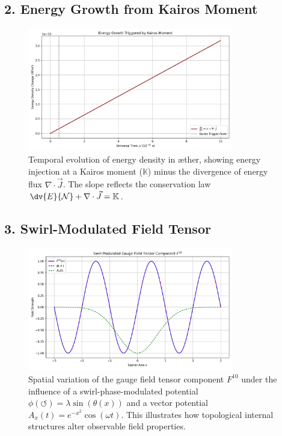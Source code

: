 \documentclass[12pt]{article}
\begin{document}
\subsection*{2. Energy Growth from Kairos Moment}
\begin{figure}[H]
    \centering
    \includegraphics[width=0.8\textwidth]{../images/SwirlClockInterference2}
    \caption{Temporal evolution of energy density in æther, showing energy injection at a Kairos moment ($\mathbb{K}$) minus the divergence of energy flux $\nabla \cdot \vec{J}$. The slope reflects the conservation law $\dv{E}{\mathcal{N}} + \nabla \cdot \vec{J} = \mathbb{K}$.}
    \label{fig:kairos_energy}
\end{figure}

\subsection*{3. Swirl-Modulated Field Tensor}
\begin{figure}[H]
    \centering
    \includegraphics[width=0.8\textwidth]{../images/SwirlClockInterference3}
    \caption{Spatial variation of the gauge field tensor component $F^{1 0}$ under the influence of a swirl-phase-modulated potential $\phi(\circlearrowleft) = \lambda \sin(\theta(x))$ and a vector potential $A_x(t) = e^{-x^2} \cos(\omega t)$. This illustrates how topological internal structures alter observable field properties.}
    \label{fig:swirl_tensor}
\end{figure}
\end{document}
